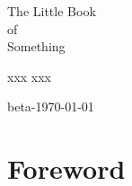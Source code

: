 \documentclass[oneside,11pt]{memoir}
\begin{document}
\thispagestyle{empty}

\begin{center}


{\huge The Little Book\\[0.75ex] of\\[1.75ex] Something}

\vspace*{4ex}

xxx xxx


\end{center}

\newpage



\lipsum[1-2]


\begin{flushright}
\footnotesize beta-\dotdate\today
\end{flushright}

\vspace*{-3ex}

\newpage


{
\everymath{\color{black}}
\tableofcontents* %
}

\clearpage

\listoffigures*
{}


\chapter*{Foreword}


\lipsum[1-3]
\end{document}
